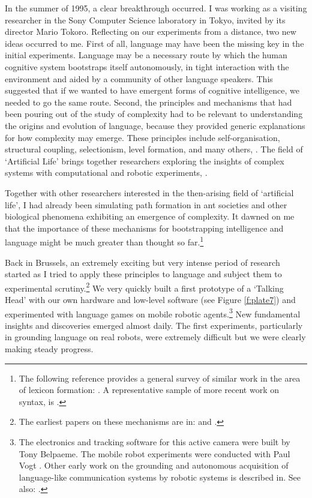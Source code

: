 In the summer of 1995, a clear breakthrough occurred.  
I was working as a visiting researcher in the Sony
Computer Science laboratory in Tokyo, invited by its director
Mario Tokoro. Reflecting on our 
experiments from a distance, two new ideas occurred to me. 
First of all, language may have been the missing key
in the initial experiments. Language may 
be a necessary route by which the human cognitive system
bootstraps itself autonomously, in tight interaction with the
environment and aided by a community of other
language speakers. This suggested that if we wanted
to have emergent
forms of cognitive intelligence, we needed to go the same 
route. Second, the principles and mechanisms that had been
pouring out of the study of complexity had to be
relevant to understanding the origins and evolution of language,
because they provided generic explanations for how complexity 
may emerge. These principles include 
self-organisation, structural coupling, 
selectionism, level formation, 
and many others, \cite{Nicolis:1989}. The field of `Artificial Life' brings together researchers
exploring the insights of complex systems with computational
and robotic experiments, \cite{Langton:1995}.

Together with 
other researchers interested in the then-arising field of `artificial life', I had 
already been simulating path formation in 
ant societies and other biological phenomena exhibiting 
an emergence of complexity. It dawned on me that the
importance of these mechanisms for bootstrapping intelligence and
language might be much greater than 
thought so far.\footnote{The following reference provides a general survey of similar work in 
the area of lexicon formation: \cite{Steels:97b}. 
A representative sample of more recent work on syntax, is \cite{Briscoe:1999}.}

Back in Brussels, an extremely exciting but very 
intense period of research started as I tried to 
apply these principles to language
and subject them to experimental 
scrutiny.\footnote{The earliest papers on these mechanisms are in: \cite{Steels:95b} and 
\cite{Steels:96a}.}
We very quickly built a first 
prototype of a `Talking Head' with our own hardware
and low-level software (see Figure \ref{f:plate7}) 
and experimented with language games on mobile 
robotic agents.\footnote{The electronics and tracking software for this 
active camera were built by Tony Belpaeme. The mobile
robot experiments were conducted with Paul Vogt \cite{Steels:97g}. 
Other early work on the grounding and autonomous acquisition of 
language-like communication systems by robotic systems is 
described in. See also: \cite{Billard:1998}.}
New fundamental insights and discoveries emerged almost daily. 
The first experiments, particularly in grounding
language on real robots, were extremely difficult but we 
were clearly making steady progress. 

